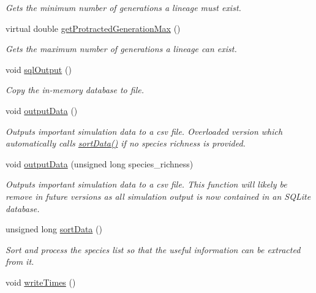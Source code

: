 \begin{DoxyCompactItemize}
\begin{DoxyCompactList}\small\item\em Gets the minimum number of generations a lineage must exist. \end{DoxyCompactList}\item 
virtual double \hyperlink{class_tree_a0c5e746982a87f24c083f4534bf92b45}{get\+Protracted\+Generation\+Max} ()
\begin{DoxyCompactList}\small\item\em Gets the maximum number of generations a lineage can exist. \end{DoxyCompactList}\item 
void \hyperlink{class_tree_a8cd3db7add1884ea53b0d98002d39cd3}{sql\+Output} ()
\begin{DoxyCompactList}\small\item\em Copy the in-\/memory database to file. \end{DoxyCompactList}\item 
void \hyperlink{class_tree_afdf680e187c25ed39d1e66542ce44cc3}{output\+Data} ()\hypertarget{class_tree_afdf680e187c25ed39d1e66542ce44cc3}{}\label{class_tree_afdf680e187c25ed39d1e66542ce44cc3}

\begin{DoxyCompactList}\small\item\em Outputs important simulation data to a csv file. Overloaded version which automatically calls \hyperlink{class_tree_a2d2065bbebee8b55270d2691d40cd974}{sort\+Data()} if no species richness is provided. \end{DoxyCompactList}\item 
void \hyperlink{class_tree_a5acf7d0eea9ea2ef4928bb6691b87724}{output\+Data} (unsigned long species\+\_\+richness)
\begin{DoxyCompactList}\small\item\em Outputs important simulation data to a csv file. This function will likely be remove in future versions as all simulation output is now contained in an S\+Q\+Lite database. \end{DoxyCompactList}\item 
unsigned long \hyperlink{class_tree_a2d2065bbebee8b55270d2691d40cd974}{sort\+Data} ()\hypertarget{class_tree_a2d2065bbebee8b55270d2691d40cd974}{}\label{class_tree_a2d2065bbebee8b55270d2691d40cd974}

\begin{DoxyCompactList}\small\item\em Sort and process the species list so that the useful information can be extracted from it. \end{DoxyCompactList}\item 
void \hyperlink{class_tree_ab8785fc9e27868a56335048321c13290}{write\+Times} ()\hypertarget{class_tree_ab8785fc9e27868a56335048321c13290}{}\label{class_tree_ab8785fc9e27868a56335048321c13290}


\end{DoxyCompactItemize}
